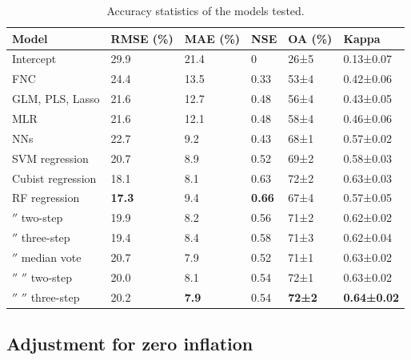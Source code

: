 \documentclass[a4paper,10pt]{article}
\begin{document}
\begin{table}
\centering
\begin{tabular}{llllll}
\toprule
\textbf{Model} & \textbf{\ac{RMSE} (\%)} & \textbf{\ac{MAE} (\%)} & \textbf{\acrshort{NSE}} & \textbf{\ac{OA} (\%)} & \textbf{Kappa} \\
\midrule
Intercept
& 29.9  & 21.4  & 0     & 26±5  & 0.13±0.07 \\
\Gls{FNC}
& 24.4  & 13.5  & 0.33  & 53±4  & 0.42±0.06 \\
\Gls{GLM}, \Gls{PLS}, Lasso
& 21.6  & 12.7  & 0.48  & 56±4  & 0.43±0.05 \\
\Gls{MLR}
& 21.6  & 12.1  & 0.48  & 58±4  & 0.46±0.06 \\
\Glspl{NN}
& 22.7  & 9.2   & 0.43  & 68±1  & 0.57±0.02 \\
\Gls{SVM} regression
& 20.7  & 8.9   & 0.52  & 69±2  & 0.58±0.03 \\
Cubist regression
& 18.1  & 8.1   & 0.63  & 72±2  & 0.63±0.03 \\
\Gls{RF} regression
& \textbf{17.3}  & 9.4   & \textbf{0.66}  & 67±4  & 0.57±0.05 \\
\ensuremath{''} two-step
& 19.9  & 8.2   & 0.56  & 71±2  & 0.62±0.02 \\
\ensuremath{''} three-step
& 19.4  & 8.4   & 0.58  & 71±3  & 0.62±0.04 \\
\ensuremath{''} median vote
& 20.7  & 7.9   & 0.52  & 71±1  & 0.63±0.02 \\
\ensuremath{''} \ensuremath{''} two-step
& 20.0  & 8.1   & 0.54  & 72±1  & 0.63±0.02 \\
\ensuremath{''} \ensuremath{''} three-step
& 20.2  & \textbf{7.9}   & 0.54  & \textbf{72±2}  & \textbf{0.64±0.02} \\
\bottomrule
\end{tabular}
\caption{Accuracy statistics of the models tested.}
\label{tab-accuracy}
\end{table}

\subsection{Adjustment for zero inflation}
\end{document}
